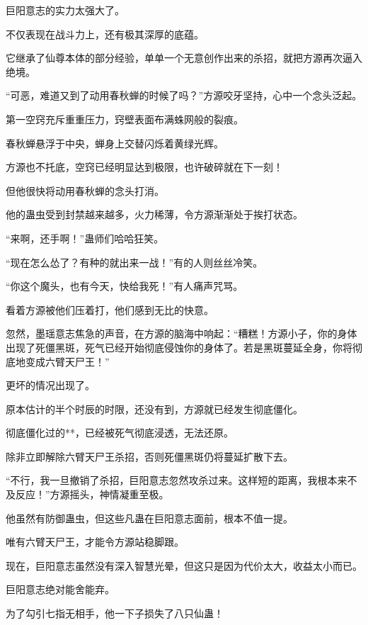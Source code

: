 
\begin{this_body}

巨阳意志的实力太强大了。

不仅表现在战斗力上，还有极其深厚的底蕴。

它继承了仙尊本体的部分经验，单单一个无意创作出来的杀招，就把方源再次逼入绝境。

“可恶，难道又到了动用春秋蝉的时候了吗？”方源咬牙坚持，心中一个念头泛起。

第一空窍充斥重重压力，窍壁表面布满蛛网般的裂痕。

春秋蝉悬浮于中央，蝉身上交替闪烁着黄绿光辉。

方源也不托底，空窍已经明显达到极限，也许破碎就在下一刻！

但他很快将动用春秋蝉的念头打消。

他的蛊虫受到封禁越来越多，火力稀薄，令方源渐渐处于挨打状态。

“来啊，还手啊！”蛊师们哈哈狂笑。

“现在怎么怂了？有种的就出来一战！”有的人则丝丝冷笑。

“你这个魔头，也有今天，快给我死！”有人痛声咒骂。

看着方源被他们压着打，他们感到无比的快意。

忽然，墨瑶意志焦急的声音，在方源的脑海中响起：“糟糕！方源小子，你的身体出现了死僵黑斑，死气已经开始彻底侵蚀你的身体了。若是黑斑蔓延全身，你将彻底地变成六臂天尸王！”

更坏的情况出现了。

原本估计的半个时辰的时限，还没有到，方源就已经发生彻底僵化。

彻底僵化过的**，已经被死气彻底浸透，无法还原。

除非立即解除六臂天尸王杀招，否则死僵黑斑仍将蔓延扩散下去。

“不行，我一旦撤销了杀招，巨阳意志忽然攻杀过来。这样短的距离，我根本来不及反应！”方源摇头，神情凝重至极。

他虽然有防御蛊虫，但这些凡蛊在巨阳意志面前，根本不值一提。

唯有六臂天尸王，才能令方源站稳脚跟。

现在，巨阳意志虽然没有深入智慧光晕，但这只是因为代价太大，收益太小而已。

巨阳意志绝对能舍能弃。

为了勾引七指无相手，他一下子损失了八只仙蛊！


\end{this_body}
